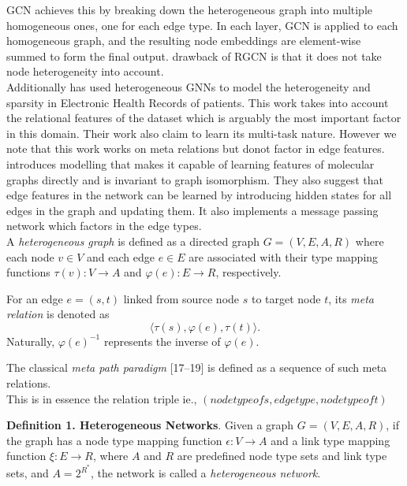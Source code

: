\documentclass{report} %
\begin{document}
GCN achieves this by breaking down the heterogeneous graph into multiple homogeneous ones, one for each edge type. In each layer, GCN is applied to each homogeneous graph, and the resulting node embeddings are element-wise
summed to form the final output.  drawback of RGCN is that it does not take node heterogeneity into account. \\

Additionally \cite{EHR HGNN-2024} has used heterogeneous \ac{GNN}s to model the heterogeneity and sparsity in Electronic Health Records of patients. 
This work takes into account the relational features of the dataset which is arguably the most important factor in this domain. 
Their work also claim to learn its multi-task nature. However we note that this work works on meta relations but donot factor in edge features.\\

\cite{QC-MP-2017} introduces modelling that makes it capable of learning features of molecular graphs directly and is invariant to graph isomorphism. 
They also suggest that edge features in the network can be learned by introducing hidden states for all edges in the graph and updating them.
It also implements a message passing network which factors in the edge types.\\

A \textit{heterogeneous graph} is defined as a directed graph \( G = (V, E, A, R) \) where each node \( v \in V \) and each edge \( e \in E \) are associated with their type mapping functions \( \tau(v) : V \rightarrow A \) and \( \varphi(e) : E \rightarrow R \), respectively.

For an edge \( e = (s, t) \) linked from source node \( s \) to target node \( t \), its \textit{meta relation} is denoted as
\[
\langle \tau(s), \varphi(e), \tau(t) \rangle.
\]
Naturally, \( \varphi(e)^{-1} \) represents the inverse of \( \varphi(e) \).

The classical \textit{meta path paradigm} [17–19] is defined as a sequence of such meta relations.\\

This is in essence the relation triple ie., \(  (node type of s, edge type, node type of t) \)

\textbf{Definition 1. Heterogeneous Networks}. Given a graph \( G = (V, E, A, R) \), if the graph has a node type mapping function \( \epsilon : V \rightarrow A \) and a link type mapping function \( \xi : E \rightarrow R \), where \( A \) and \( R \) are predefined node type sets and link type sets, and \( A = 2^{R^*} \), the network is called a \textit{heterogeneous network}.
\end{document}
